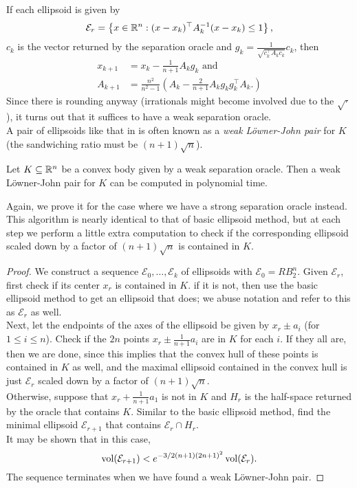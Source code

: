 If each ellipsoid is given by
\[ \mathcal{E}_r = \left\{x\in\mathbb{R}^n : (x-x_k)^\top A_k^{-1} (x-x_k) \leq 1 \right\}, \]
$c_k$ is the vector returned by the separation oracle and $g_k = \frac{1}{\sqrt{c_k^\top A_k c_k}} c_k$, then
\begin{align*}
	x_{k+1} &= x_k - \frac{1}{n+1}A_k g_k\text{ and } \\
	A_{k+1} &= \frac{n^2}{n^2-1} \left( A_k - \frac{2}{n+1}A_k g_k g_k^\top A_k. \right)
\end{align*}
Since there is rounding anyway (irrationals might become involved due to the $\sqrt{\cdot}$), it turns out that it suffices to have a weak separation oracle.\\

A pair of ellipsoids like that in  is often known as a \textit{weak L\"owner-John pair} for $K$ (the sandwiching ratio must be $(n+1)\sqrt n$). 

\begin{ftheo}
	\label{lovasz pre-sandwich}
	Let $K\subseteq\mathbb{R}^n$ be a convex body given by a weak separation oracle. Then a weak L\"owner-John pair for $K$ can be computed in polynomial time. 
\end{ftheo}
Again, we prove it for the case where we have a strong separation oracle instead. This algorithm is nearly identical to that of basic ellipsoid method, but at each step we perform a little extra computation to check if the corresponding ellipsoid scaled down by a factor of $(n+1)\sqrt{n}$ is contained in $K$.
\begin{proof}
	We construct a sequence $\mathcal{E}_0,\ldots,\mathcal{E}_k$ of ellipsoids with $\mathcal{E}_0=R B_2^n$. Given $\mathcal{E}_r$, first check if its center $x_r$ is contained in $K$. if it is not, then use the basic ellipsoid method to get an ellipsoid that does; we abuse notation and refer to this as $\mathcal{E}_r$ as well.\\
	Next, let the endpoints of the axes of the ellipsoid be given by $x_r \pm a_i$ (for $1\leq i\leq n$). Check if the $2n$ points $x_r \pm \frac{1}{n+1} a_i$ are in $K$ for each $i$. If they all are, then we are done, since this implies that the convex hull of these points is contained in $K$ as well, and the maximal ellipsoid contained in the convex hull is just $\mathcal{E}_r$ scaled down by a factor of $(n+1)\sqrt{n}$.\\
	Otherwise, suppose that $x_r+\frac{1}{n+1}a_1$ is not in $K$ and $H_r$ is the half-space returned by the oracle that contains $K$. Similar to the basic ellipsoid method, find the minimal ellipsoid $\mathcal{E}_{r+1}$ that contains $\mathcal{E}_r\cap H_r$.\\
	It may be shown that in this case,
	\[ \operatorname{vol}(\mathcal{E}_{r+1}) < e^{-3/2(n+1)(2n+1)^2}\operatorname{vol}(\mathcal{E}_r). \]
	The sequence terminates when we have found a weak L\"owner-John pair.
\end{proof}

